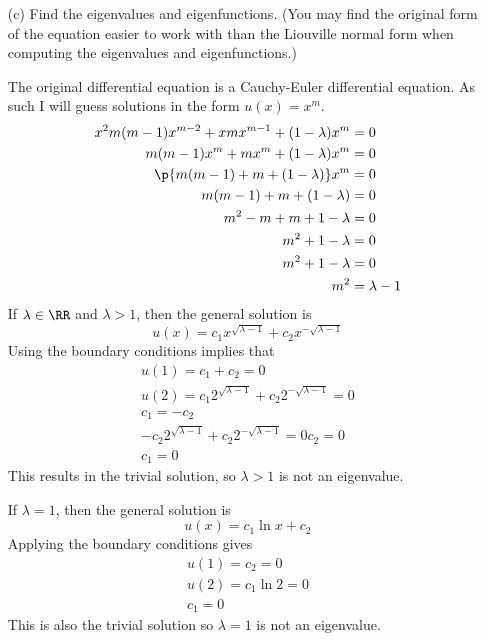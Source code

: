 \documentclass[11pt, oneside]{article}
\begin{document}
\begin{enumerate}
\begin{enumerate}
      \item[(c)]
        Find the eigenvalues and eigenfunctions.
        (You may find the original form of the equation easier to work with than
        the Liouville normal form when computing the eigenvalues and
        eigenfunctions.)

        The original differential equation is a Cauchy-Euler differential
        equation.
        As such I will guess solutions in the form $u(x) = x^m$.
        \begin{align*}
          x^2 m(m - 1) x^{m - 2} + x m x^{m - 1} + (1 - \lambda) x^m &= 0 \\ 
          m(m - 1) x^m + m x^m + (1 - \lambda) x^m &= 0 \\ 
          \p{m(m - 1) + m + (1 - \lambda)} x^m &= 0 \\ 
          m(m - 1) + m + (1 - \lambda) &= 0 \\ 
          m^2 - m + m + 1 - \lambda &= 0 \\ 
          m^2 + 1 - \lambda &= 0 \\ 
          m^2 + 1 - \lambda &= 0 \\ 
          m^2 &= \lambda - 1
        \end{align*}
        If $\lambda \in \RR$ and $\lambda > 1$, then the general solution is
        \[
          u(x) = c_1 x^{\sqrt{\lambda - 1}} + c_2 x^{-\sqrt{\lambda - 1}}
        \]
        Using the boundary conditions implies that
        \begin{align*}
          u(1) = c_1 + c_2 = 0 \\
          u(2) = c_1 2^{\sqrt{\lambda - 1}} + c_2 2^{-\sqrt{\lambda - 1}} = 0\\
          c_1 = -c_2 \\
          -c_2 2^{\sqrt{\lambda - 1}} + c_2 2^{-\sqrt{\lambda - 1}} = 0
          c_2 = 0 \\
          c_1 = 0
        \end{align*}
        This results in the trivial solution, so $\lambda > 1$ is not an
        eigenvalue.

        If $\lambda = 1$, then the general solution is
        \[
          u(x) = c_1 \ln{x} + c_2
        \]
        Applying the boundary conditions gives
        \begin{align*}
          u(1) = c_2 = 0 \\
          u(2) = c_1 \ln{2} = 0 \\
          c_1 = 0
        \end{align*}
        This is also the trivial solution so $\lambda = 1$ is not an eigenvalue.


\end{enumerate}
\end{enumerate}
\end{document}
